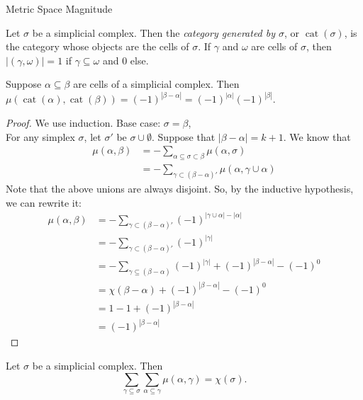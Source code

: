 \documentclass[12pt]{pom_thesis}
\DeclareMathOperator{\cat}{cat}
\begin{document}
\begin{chapter}{Metric Space Magnitude}
\begin{defn}
Let $\sigma$ be a simplicial complex. Then the \emph{category generated by $\sigma$}, or $\cat(\sigma)$, is the category whose objects are the cells of $\sigma$. If $\gamma$ and $\omega$ are cells of $\sigma$, then $|(\gamma, \omega)| = 1$ if $\gamma \subseteq \omega$ and 0 else.
\end{defn}
\begin{lemma}
\label{mu_lemma}
Suppose $\alpha \subseteq \beta$ are cells of a simplicial complex. Then $\mu(\cat(\alpha), \cat(\beta)) =(-1)^{|\beta - \alpha|} = (-1)^{|\alpha|} (-1)^{|\beta|}$.
\end{lemma}
\begin{proof}
We use induction. Base case: $\sigma = \beta$, \checkmark \\
For any simplex $\sigma$, let $\sigma'$ be $\sigma \cup \emptyset$. Suppose that $|\beta - \alpha| = k+1$. We know that \begin{align*}
\mu(\alpha, \beta) &=  - \sum_{\alpha \subseteq \sigma \subset \beta} \mu(\alpha, \sigma)\\
&= - \sum_{\gamma \subset (\beta - \alpha)'} \mu(\alpha, \gamma \cup \alpha) 
\end{align*}
Note that the above unions are always disjoint. So, by the inductive hypothesis, we can rewrite it:
\begin{align*}
\mu(\alpha, \beta) &= - \sum_{\gamma \subset (\beta - \alpha)'} (-1)^{|\gamma \cup \alpha| - |\alpha|} \\ %
&= - \sum_{\gamma \subset (\beta - \alpha)'} (-1)^{|\gamma|}\\ %
&= - \sum_{\gamma \subseteq (\beta - \alpha)} (-1)^{|\gamma|} + (-1)^{|\beta - \alpha|} - (-1)^0 \\ %
&= \chi(\beta - \alpha) + (-1)^{|\beta - \alpha|} - (-1)^0\\
&= 1-1+ (-1)^{|\beta - \alpha|}\\
&= (-1)^{|\beta - \alpha|}
\end{align*}


\end{proof}
\begin{thm}
\label{consistentEuler}
Let $\sigma$ be a simplicial complex. Then 
\[
\sum_{\gamma \subseteq \sigma} \sum_{\alpha \subseteq \gamma} \mu(\alpha, \gamma) = \chi(\sigma).
\]


\end{thm}
\end{chapter}
\end{document}
